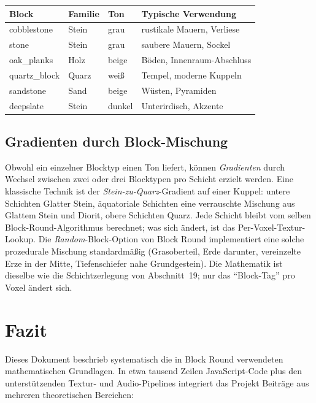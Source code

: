 \documentclass[12pt,a4paper]{scrartcl}
\begin{document}
\vspace{0.4em}
\begin{center}
\begin{tabular}{@{}llll@{}}
\toprule
\textbf{Block} & \textbf{Familie} & \textbf{Ton} & \textbf{Typische Verwendung} \\
\midrule
cobblestone        & Stein  & grau  & rustikale Mauern, Verliese \\
stone              & Stein  & grau  & saubere Mauern, Sockel \\
oak\_planks        & Holz   & beige   & Böden, Innenraum-Abschluss \\
quartz\_block      & Quarz    & weiß   & Tempel, moderne Kuppeln \\
sandstone          & Sand   & beige   & Wüsten, Pyramiden \\
deepslate          & Stein  & dunkel  & Unterirdisch, Akzente \\
\bottomrule
\end{tabular}
\end{center}

\subsection{Gradienten durch Block-Mischung}
Obwohl ein einzelner Blocktyp einen Ton liefert, können \emph{Gradienten} durch Wechsel zwischen zwei oder drei Blocktypen pro Schicht erzielt werden. Eine klassische Technik ist der \emph{Stein-zu-Quarz}-Gradient auf einer Kuppel: untere Schichten Glatter Stein, äquatoriale Schichten eine verrauschte Mischung aus Glattem Stein und Diorit, obere Schichten Quarz. Jede Schicht bleibt vom selben Block-Round-Algorithmus berechnet; was sich ändert, ist das Per-Voxel-Textur-Lookup. Die \emph{Random}-Block-Option von Block Round implementiert eine solche prozedurale Mischung standardmäßig (Grasoberteil, Erde darunter, vereinzelte Erze in der Mitte, Tiefenschiefer nahe Grundgestein). Die Mathematik ist dieselbe wie die Schichtzerlegung von Abschnitt~19; nur das \enquote{Block-Tag} pro Voxel ändert sich.

\section{Fazit}

Dieses Dokument beschrieb systematisch die in Block Round verwendeten mathematischen Grundlagen. In etwa tausend Zeilen JavaScript-Code plus den unterstützenden Textur- und Audio-Pipelines integriert das Projekt Beiträge aus mehreren theoretischen Bereichen:
\end{document}
